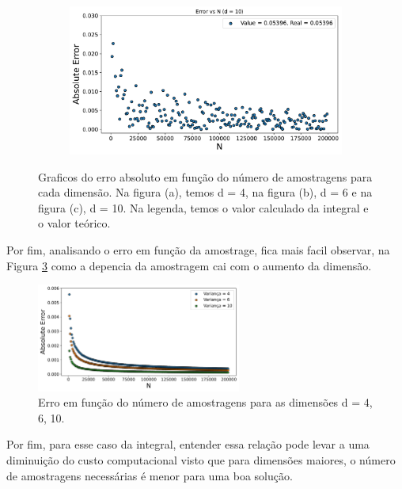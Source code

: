 \documentclass[a4paper, 12pt]{article}
\begin{document}
\begin{figure}[!htb]
    \vspace{0.5cm} %
    \begin{subfigure}{0.6\textwidth}
        \centering
        \includegraphics[width=\linewidth]{Q10.pdf}
        \caption{}
        \label{fig:subfig3}
    \end{subfigure}

    \caption{Graficos do erro absoluto em função do número de amostragens para cada dimensão. 
    Na figura (a), temos d = 4, na figura (b), d = 6 e na figura (c), d = 10. Na legenda, temos
    o valor calculado da integral e o valor teórico.} 
    \label{f1}
\end{figure}

Por fim, analisando o erro em função da amostrage, fica mais facil observar, na Figura \ref{f2}
como a depencia da amostragem cai com o aumento da dimensão.

\begin{figure}[!htb]
    \centering
    \includegraphics[width=0.6\textwidth]{erro.pdf}
    \caption{Erro em função do número de amostragens para as dimensões d = 4, 6, 10.}
    \label{f2}
\end{figure}

Por fim, para esse caso da integral, entender essa relação pode levar a uma diminuição do custo computacional
visto que para dimensões maiores, o número de amostragens necessárias é menor para uma boa solução.
\end{document}
